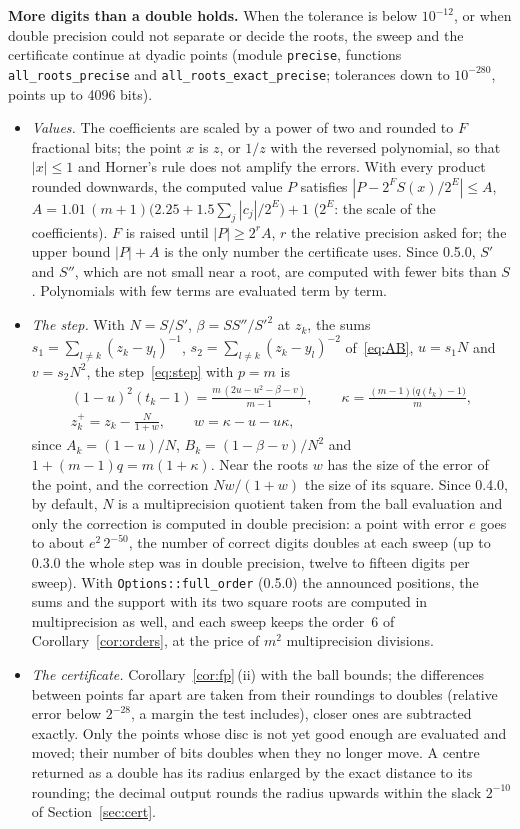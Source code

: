 \documentclass[10pt,a4paper]{article}
\theoremstyle{definition}
\numberwithin{equation}{section}
\begin{document}
\textbf{More digits than a double holds.} When the tolerance is below $10^{-12}$, or when double
precision could not separate or decide the roots, the sweep and the certificate continue at dyadic
points (module \texttt{precise}, functions \texttt{all\_roots\_precise} and
\texttt{all\_roots\_exact\_precise}; tolerances down to $10^{-280}$, points up to 4096 bits).
\begin{itemize}
\item \emph{Values.} The coefficients are scaled by a power of two and rounded to $F$ fractional bits;
 the point $x$ is $z$, or $1/z$ with the reversed polynomial, so that $|x|\le1$ and Horner's rule does
 not amplify the errors. With every product rounded downwards, the computed value $P$ satisfies
 $|P-2^FS(x)/2^E|\le A$, $A=1.01\,(m+1)\bigl(2.25+1.5\sum_j|c_j|/2^E\bigr)+1$ ($2^E$: the scale of the
 coefficients). $F$ is raised until $|P|\ge2^{r}A$, $r$ the relative precision asked for; the upper
 bound $|P|+A$ is the only number the certificate uses. Since 0.5.0, $S'$ and $S''$, which are not small
 near a root, are computed with fewer bits than $S$. Polynomials with few terms are evaluated term by
 term.
\item \emph{The step.} With $N=S/S'$, $\beta=SS''/S'^2$ at $z_k$, the sums
 $s_1=\sum_{l\ne k}(z_k-y_l)^{-1}$, $s_2=\sum_{l\ne k}(z_k-y_l)^{-2}$ of~\eqref{eq:AB}, $u=s_1N$ and
 $v=s_2N^2$, the step~\eqref{eq:step} with $p=m$ is
 \begin{equation}\label{eq:precise}
 \begin{gathered}
 (1-u)^2(t_k-1)=\frac{m\,(2u-u^2-\beta-v)}{m-1},\qquad \kappa=\frac{(m-1)\bigl(q(t_k)-1\bigr)}{m},\\
 z_k^+=z_k-\frac{N}{1+w},\qquad w=\kappa-u-u\kappa,
 \end{gathered}
 \end{equation}
 since $A_k=(1-u)/N$, $B_k=(1-\beta-v)/N^2$ and $1+(m-1)q=m(1+\kappa)$. Near the roots $w$ has the
 size of the error of the point, and the correction $Nw/(1+w)$ the size of its square. Since 0.4.0, by
 default, $N$ is a multiprecision quotient taken from the ball evaluation and only the correction is
 computed in double precision: a point with error $e$ goes to about $e^2\,2^{-50}$, the number of
 correct digits doubles at each sweep (up to 0.3.0 the whole step was in double precision, twelve to
 fifteen digits per sweep). With \texttt{Options::full\_order} (0.5.0) the announced positions, the
 sums and the support with its two square roots are computed in multiprecision as well, and each sweep
 keeps the order~6 of Corollary~\ref{cor:orders}, at the price of $m^2$ multiprecision divisions.
\item \emph{The certificate.} Corollary~\ref{cor:fp}\,(ii) with the ball bounds; the differences between
 points far apart are taken from their roundings to doubles (relative error below $2^{-28}$, a margin
 the test includes), closer ones are subtracted exactly. Only the points whose disc is not yet good
 enough are evaluated and moved; their number of bits doubles when they no longer move. A centre
 returned as a double has its radius enlarged by the exact distance to its rounding; the decimal output
 rounds the radius upwards within the slack $2^{-10}$ of Section~\ref{sec:cert}.
\end{itemize}
\end{document}

